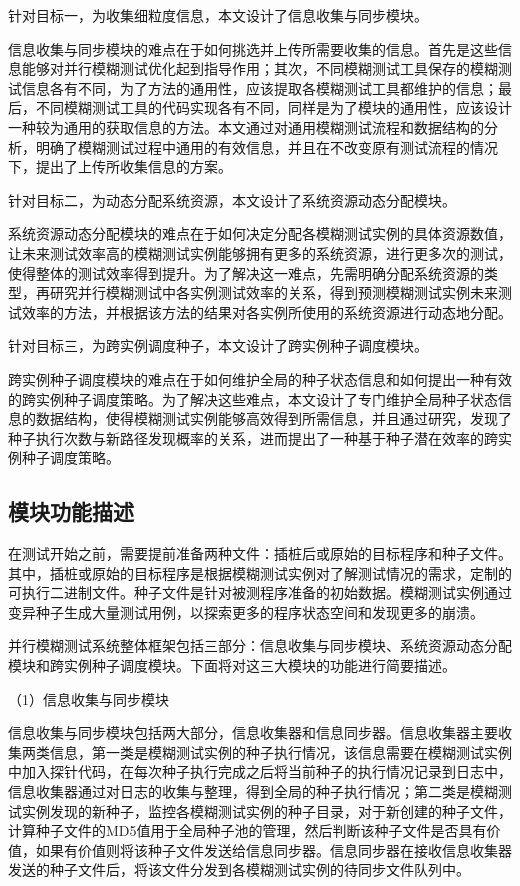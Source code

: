 \documentclass[master]{thesis-uestc}
\begin{document}
针对目标一，为收集细粒度信息，本文设计了信息收集与同步模块。

信息收集与同步模块的难点在于如何挑选并上传所需要收集的信息。首先是这些信息能够对并行模糊测试优化起到指导作用；其次，不同模糊测试工具保存的模糊测试信息各有不同，为了方法的通用性，应该提取各模糊测试工具都维护的信息；最后，不同模糊测试工具的代码实现各有不同，同样是为了模块的通用性，应该设计一种较为通用的获取信息的方法。本文通过对通用模糊测试流程和数据结构的分析，明确了模糊测试过程中通用的有效信息，并且在不改变原有测试流程的情况下，提出了上传所收集信息的方案。

针对目标二，为动态分配系统资源，本文设计了系统资源动态分配模块。

系统资源动态分配模块的难点在于如何决定分配各模糊测试实例的具体资源数值，让未来测试效率高的模糊测试实例能够拥有更多的系统资源，进行更多次的测试，使得整体的测试效率得到提升。为了解决这一难点，先需明确分配系统资源的类型，再研究并行模糊测试中各实例测试效率的关系，得到预测模糊测试实例未来测试效率的方法，并根据该方法的结果对各实例所使用的系统资源进行动态地分配。

针对目标三，为跨实例调度种子，本文设计了跨实例种子调度模块。

跨实例种子调度模块的难点在于如何维护全局的种子状态信息和如何提出一种有效的跨实例种子调度策略。为了解决这些难点，本文设计了专门维护全局种子状态信息的数据结构，使得模糊测试实例能够高效得到所需信息，并且通过研究，发现了种子执行次数与新路径发现概率的关系，进而提出了一种基于种子潜在效率的跨实例种子调度策略。

\subsection{模块功能描述}

在测试开始之前，需要提前准备两种文件：插桩后或原始的目标程序和种子文件。其中，插桩或原始的目标程序是根据模糊测试实例对了解测试情况的需求，定制的可执行二进制文件。种子文件是针对被测程序准备的初始数据。模糊测试实例通过变异种子生成大量测试用例，以探索更多的程序状态空间和发现更多的崩溃。

并行模糊测试系统整体框架包括三部分：信息收集与同步模块、系统资源动态分配模块和跨实例种子调度模块。下面将对这三大模块的功能进行简要描述。

（1）信息收集与同步模块

信息收集与同步模块包括两大部分，信息收集器和信息同步器。信息收集器主要收集两类信息，第一类是模糊测试实例的种子执行情况，该信息需要在模糊测试实例中加入探针代码，在每次种子执行完成之后将当前种子的执行情况记录到日志中，信息收集器通过对日志的收集与整理，得到全局的种子执行情况；第二类是模糊测试实例发现的新种子，监控各模糊测试实例的种子目录，对于新创建的种子文件，计算种子文件的MD5值用于全局种子池的管理，然后判断该种子文件是否具有价值，如果有价值则将该种子文件发送给信息同步器。信息同步器在接收信息收集器发送的种子文件后，将该文件分发到各模糊测试实例的待同步文件队列中。
\end{document}
